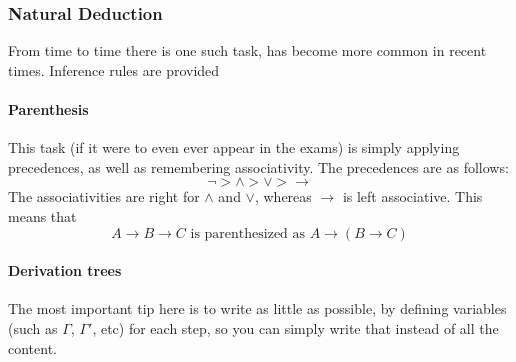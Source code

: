 \newpage
\subsubsection{Natural Deduction}
\begin{examdetails}
    From time to time there is one such task, has become more common in recent times. Inference rules are provided
\end{examdetails}
\paragraph{Parenthesis}
This task (if it were to even ever appear in the exams) is simply applying precedences, as well as remembering associativity.
The precedences are as follows:
\[
    \neg > \land > \lor > \rightarrow
\]
The associativities are right for $\land$ and $\lor$, whereas $\rightarrow$ is left associative. This means that
\[
    A \rightarrow B \rightarrow C \text{ is parenthesized as } A \rightarrow (B \rightarrow C)
\]


\paragraph{Derivation trees}
The most important tip here is to write as little as possible, by defining variables (such as $\Gamma$, $\Gamma'$, etc) for each step,
so you can simply write that instead of all the content.



